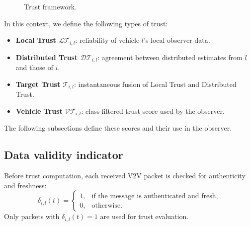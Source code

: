 \documentclass[letterpaper,journal]{IEEEtran}
\def\LT{\mathcal{LT}} %
\def\DT{\mathcal{DT}} %
\def\VT{\mathcal{VT}} %
\def\T{\mathcal{T}} %
\begin{document}
\begin{figure}[!ht]
    \caption{Trust framework.}
    \label{fig_trust_framework}
\end{figure}

In this context, we define the following types of trust:
\begin{itemize}
    \item \textbf{Local Trust $\LT_{i,l}$}: reliability of vehicle $l$'s local-observer data.
    \item \textbf{Distributed Trust $\DT_{i,l}$}: agreement between distributed estimates from $l$ and those of $i$.
    \item \textbf{Target Trust $\T_{i,l}$}: instantaneous fusion of Local Trust and Distributed Trust.
    \item \textbf{Vehicle Trust $\VT_{i,l}$}: class-filtered trust score used by the observer.
\end{itemize}

The following subsections define these scores and their use in the observer.
\subsection{Data validity indicator}

Before trust computation, each received V2V packet is checked for authenticity and freshness:
{\small
\begin{equation}
    \delta_{i,l}(t)=
    \begin{cases}
        1, & \text{if the message is authenticated and fresh}, \\
        0, & \text{otherwise.}
    \end{cases}
\end{equation}
}
Only packets with $\delta_{i,l}(t)=1$ are used for trust evaluation.
\end{document}

